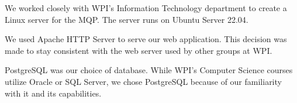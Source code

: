 We worked closely with WPI's Information Technology department to create a Linux server for the MQP.
The server runs on Ubuntu Server 22.04.


    We used Apache HTTP Server to serve our web application.
    This decision was made to stay consistent with the web server used by other groups at WPI.


    PostgreSQL was our choice of database.
    While WPI's Computer Science courses utilize Oracle or SQL Server, we chose PostgreSQL because of our familiarity with it and its capabilities.

